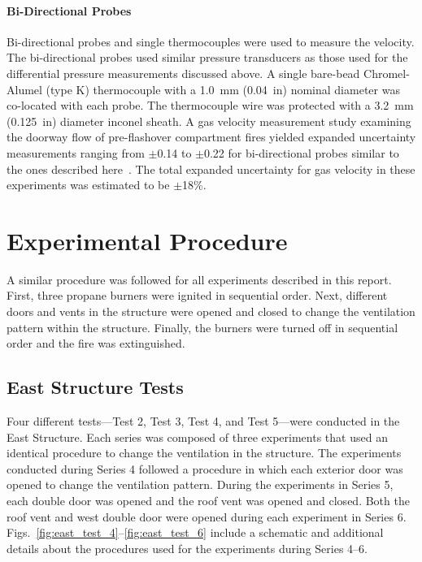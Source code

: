 \documentclass[12pt,oneside]{book}
\begin{document}
\subsubsection{Bi-Directional Probes}
Bi-directional probes and single thermocouples were used to measure the velocity. The bi-directional probes used similar pressure transducers as those used for the differential pressure measurements discussed above. A single bare-bead Chromel-Alumel (type K) thermocouple with a 1.0~mm (0.04~in) nominal diameter was co-located with each probe. The thermocouple wire was protected with a 3.2~mm (0.125~in) diameter inconel sheath. A gas velocity measurement study examining the doorway flow of pre-flashover compartment fires yielded expanded uncertainty measurements ranging from $\pm$0.14 to $\pm$0.22 for bi-directional probes similar to the ones described here~\cite{Bryant:FSJ2009}. The total expanded uncertainty for gas velocity in these experiments was estimated to be $\pm$18\%.

\clearpage

\chapter{Experimental Procedure}
\label{chap:Experimental_Procedure}
A similar procedure was followed for all experiments described in this report. First, three propane burners were ignited in sequential order. Next, different doors and vents in the structure were opened and closed to change the ventilation pattern within the structure. Finally, the burners were turned off in sequential order and the fire was extinguished.

\section{East Structure Tests}
\label{sec:east_procedure}
Four different tests---Test 2, Test 3, Test 4, and Test 5---were conducted in the East Structure. Each series was composed of three experiments that used an identical procedure to change the ventilation in the structure. The experiments conducted during Series 4 followed a procedure in which each exterior door was opened to change the ventilation pattern. During the experiments in Series 5, each double door was opened and the roof vent was opened and closed. Both the roof vent and west double door were opened during each experiment in Series 6. Figs.~\ref{fig:east_test_4}--\ref{fig:east_test_6} include a schematic and additional details about the procedures used for the experiments during Series 4--6.
\end{document}
